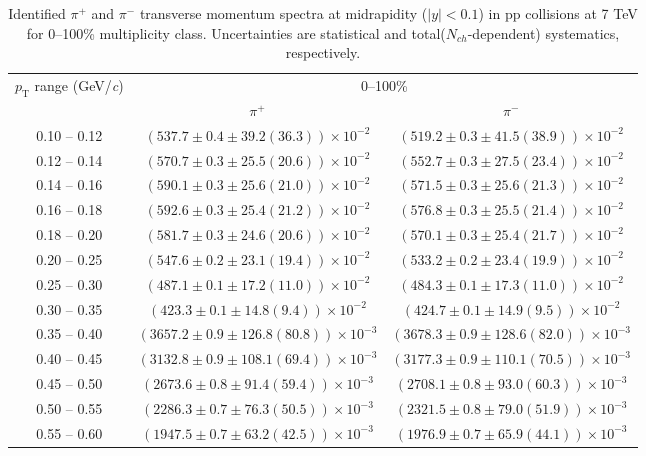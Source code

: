 
 
\clearpage
\begin{table}
\caption{Identified $\pi^{+}$ and $\pi^{-}$  transverse momentum spectra at midrapidity ($|y|<0.1$) in pp collisions at 7 TeV for 0--100\% multiplicity class. Uncertainties are statistical and total($N_{ch}$-dependent) systematics, respectively.}
\label{tab:PionPlus_PionMinus_0to100}
\begin{center}
\begin{tabular}{ c | c c }
\hline
\multirow{2}{*}{$p_{\mathrm{T}}$ range (GeV/\textit{c})} & \multicolumn{2}{c}{0--100\%} \\ & $\pi^{+}$& $\pi^{-}$\\ 
\hline
0.10 -- 0.12 & $(537.7\pm0.4\pm39.2(36.3))\times10^{-2}$ & $(519.2\pm0.3\pm41.5(38.9))\times10^{-2}$ \\ 
0.12 -- 0.14 & $(570.7\pm0.3\pm25.5(20.6))\times10^{-2}$ & $(552.7\pm0.3\pm27.5(23.4))\times10^{-2}$ \\ 
0.14 -- 0.16 & $(590.1\pm0.3\pm25.6(21.0))\times10^{-2}$ & $(571.5\pm0.3\pm25.6(21.3))\times10^{-2}$ \\ 
0.16 -- 0.18 & $(592.6\pm0.3\pm25.4(21.2))\times10^{-2}$ & $(576.8\pm0.3\pm25.5(21.4))\times10^{-2}$ \\ 
0.18 -- 0.20 & $(581.7\pm0.3\pm24.6(20.6))\times10^{-2}$ & $(570.1\pm0.3\pm25.4(21.7))\times10^{-2}$ \\ 
0.20 -- 0.25 & $(547.6\pm0.2\pm23.1(19.4))\times10^{-2}$ & $(533.2\pm0.2\pm23.4(19.9))\times10^{-2}$ \\ 
0.25 -- 0.30 & $(487.1\pm0.1\pm17.2(11.0))\times10^{-2}$ & $(484.3\pm0.1\pm17.3(11.0))\times10^{-2}$ \\ 
0.30 -- 0.35 & $(423.3\pm0.1\pm14.8(9.4))\times10^{-2}$ & $(424.7\pm0.1\pm14.9(9.5))\times10^{-2}$ \\ 
0.35 -- 0.40 & $(3657.2\pm0.9\pm126.8(80.8))\times10^{-3}$ & $(3678.3\pm0.9\pm128.6(82.0))\times10^{-3}$ \\ 
0.40 -- 0.45 & $(3132.8\pm0.9\pm108.1(69.4))\times10^{-3}$ & $(3177.3\pm0.9\pm110.1(70.5))\times10^{-3}$ \\ 
0.45 -- 0.50 & $(2673.6\pm0.8\pm91.4(59.4))\times10^{-3}$ & $(2708.1\pm0.8\pm93.0(60.3))\times10^{-3}$ \\ 
0.50 -- 0.55 & $(2286.3\pm0.7\pm76.3(50.5))\times10^{-3}$ & $(2321.5\pm0.8\pm79.0(51.9))\times10^{-3}$ \\ 
0.55 -- 0.60 & $(1947.5\pm0.7\pm63.2(42.5))\times10^{-3}$ & $(1976.9\pm0.7\pm65.9(44.1))\times10^{-3}$ \\ 

\end{tabular}
\end{center}
\end{table}
